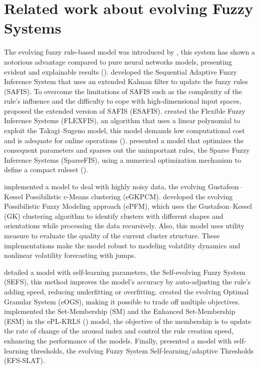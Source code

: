 \section{Related work about evolving Fuzzy Systems}
The evolving fuzzy rule-based model was introduced by \citet{angelov2001evolving}, this system has shown a notorious advantage compared to pure neural networks models, presenting evident and explainable results (\citealt{angelov2010evolving, leite2020overview}). \citet{rong2006sequential} developed the Sequential Adaptive Fuzzy Inference System that uses an extended Kalman filter to update the fuzzy rules (SAFIS). To overcome the limitations of SAFIS such as the complexity of the rule's influence and the difficulty to cope with high-dimensional input spaces, \citet{rong2011extended} proposed the extended version of SAFIS (ESAFIS). \citet{lughofer2008flexfis} created the Flexible Fuzzy Inference Systems (FLEXFIS), an algorithm that uses a linear polynomial to exploit the Takagi–Sugeno model, this model demands low computational cost and is adequate for online operations (\citealt{trawinski2011investigation}). \citet{lughofer2010sparsefis} presented a model that optimizes the consequent parameters and sparses out the unimportant rules, the Sparse Fuzzy Inference Systems (SparseFIS), using a numerical optimization mechanism to define a compact ruleset (\citealt{serdio2013data}).

\citet{vskrjanc2015evolving} implemented a model to deal with highly noisy data, the evolving Gustafson–Kessel Possibilistic c-Means clustering (eGKPCM). \cite{maciel2016evolving} developed the evolving Possibilistic Fuzzy Modeling approach (ePFM), which uses the Gustafson–Kessel (GK) clustering algorithm to identify clusters with different shapes and orientations while processing the data recursively. Also, this model uses utility measure to evaluate the quality of the current cluster structure. These implementations make the model robust to modeling volatility dynamics and nonlinear volatility forecasting with jumps.

\citet{ge2018self} detailed a model with self-learning parameters, the Self-evolving Fuzzy System (SEFS), this method improves the model’s accuracy by auto-adjusting the rule’s adding speed, reducing underfitting or overfitting. \citet{leite2019optimal} created the evolving Optimal Granular System (eOGS), making it possible to trade off multiple objectives. \citet{alves2020enhanced} implemented the Set-Membership (SM) and the Enhanced Set-Membership (ESM) in the ePL-KRLS (\citealt{alves2021novel}) model, the objective of the membership is to update the rate of change of the arousal index and control the rule creation speed, enhancing the performance of the models. Finally, \cite{ge2020learning} presented a model with self-learning thresholds, the evolving Fuzzy System Self-learning/adaptive Thresholds (EFS-SLAT). 


